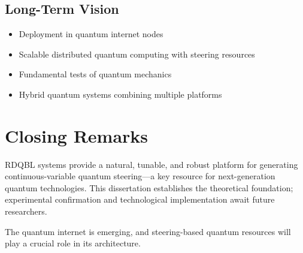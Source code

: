 \subsection{Long-Term Vision}

\begin{itemize}
	\item Deployment in quantum internet nodes
	\item Scalable distributed quantum computing with steering resources
	\item Fundamental tests of quantum mechanics
	\item Hybrid quantum systems combining multiple platforms
\end{itemize}

\section{Closing Remarks}

RDQBL systems provide a natural, tunable, and robust platform for generating continuous-variable quantum steering—a key resource for next-generation quantum technologies. This dissertation establishes the theoretical foundation; experimental confirmation and technological implementation await future researchers.

The quantum internet is emerging, and steering-based quantum resources will play a crucial role in its architecture.

